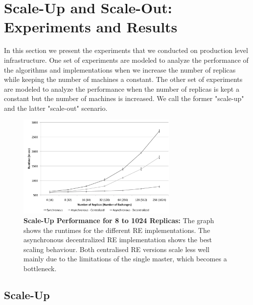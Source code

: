 \documentclass{rspublic}
\begin{document}
\section{Scale-Up and Scale-Out: Experiments and Results}
\label{sec:performance}
In this section we present the experiments that we conducted on 
production level infrastructure. One set of experiments are modeled to 
analyze the performance of the algorithms and implementations when we 
increase the number of replicas while keeping the number of machines 
a constant. The other set of experiments are modeled to analyze the 
performance when the number of replicas is kept a constant but the 
number of machines is increased. We call the former "scale-up" and 
the latter "scale-out" scenario.

%
\begin{figure}
\centering
\includegraphics[width=0.7\textwidth]{../data/scale_up.pdf}
\caption{\small \textbf{Scale-Up Performance for 8 to 1024 Replicas:} 
  The graph shows the runtimes for the different RE implementations.
  The asynchronous decentralized RE implementation shows the best
  scaling behaviour. Both centralised RE versions scale less well mainly due
  to the limitations of the single master, which becomes a bottleneck.}
\label{fig:graph}
\vspace{-1em}
\end{figure}

\subsection{Scale-Up}
\end{document}
